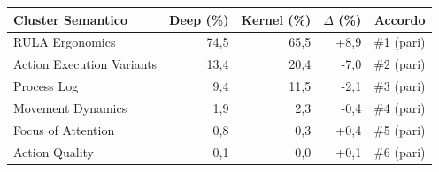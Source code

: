 \begin{tabular*}{\linewidth}{@{}l@{\extracolsep{\fill}}rrrr@{}}
\toprule
\textbf{Cluster Semantico} & \textbf{Deep (\%)} & \textbf{Kernel (\%)} & \textbf{$\Delta$ (\%)} & \textbf{Accordo} \\
\midrule
RULA Ergonomics & 74{,}5 & 65{,}5 & +8{,}9 & \#1 (pari) \\
Action Execution Variants & 13{,}4 & 20{,}4 & -7{,}0 & \#2 (pari) \\
Process Log & 9{,}4 & 11{,}5 & -2{,}1 & \#3 (pari) \\
Movement Dynamics & 1{,}9 & 2{,}3 & -0{,}4 & \#4 (pari) \\
Focus of Attention & 0{,}8 & 0{,}3 & +0{,}4 & \#5 (pari) \\
Action Quality & 0{,}1 & 0{,}0 & +0{,}1 & \#6 (pari) \\
\bottomrule
\end{tabular*}
